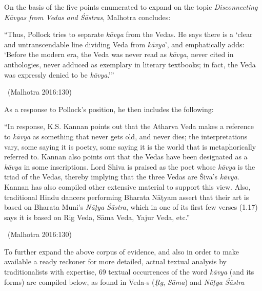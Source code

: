 On the basis of the five points enumerated to expand on the topic \textit{Disconnecting Kāvyas from Vedas and Śāstras}, Malhotra concludes:

\begin{myquote}
 “Thus, Pollock tries to separate \textit{kāvya} from the Vedas. He says there is a ‘clear and untranscendable line dividing Veda from \textit{kāvya}’, and emphatically adds: ‘Before the modern era, the Veda was never read as \textit{kāvya}, never cited in anthologies, never adduced as exemplary in literary textbooks; in fact, the Veda was expressly denied to be \textit{kāvya}.’” 

~\hfill (Malhotra 2016:130)
\end{myquote}

As a response to Pollock’s position, he then includes the following:

\begin{myquote}
“In response, K.S. Kannan points out that the Atharva Veda makes a reference to \textit{kāvya} as something that never gets old, and never dies; the interpretations vary, some saying it is poetry, some saying it is the world that is metaphorically referred to. Kannan also points out that the Vedas have been designated as a \textit{kāvya} in some inscriptions. Lord Shiva is praised as the poet whose \textit{kāvya} is the triad of the Vedas, thereby implying that the three Vedas are Śiva’s \textit{kāvya}. Kannan has also compiled other extensive material to support this view. Also, traditional Hindu dancers performing Bharata Nāṭyam assert that their art is based on Bharata Muni’s \textit{Nāṭya Śāstra}, which in one of its first few verses (1.17) says it is based on Rig Veda, Sāma Veda, Yajur Veda, etc.” 

~\hfill (Malhotra 2016:130)
\end{myquote}

To further expand the above corpus of evidence, and also in order to make available a ready reckoner for more detailed, actual textual analysis by traditionalists with expertise, 69 textual occurrences of the word \textit{kāvya} (and its forms) are compiled below, as found in Veda-s (\textit{Ṛg}, \textit{Sāma}) and \textit{Nāṭya Śāstra}


